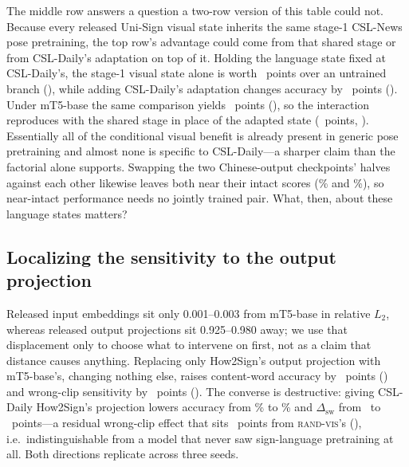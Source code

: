 \documentclass[11pt]{article}
\begin{document}
The middle row answers a question a two-row version of this table could not.
Because every released Uni-Sign visual state inherits the same stage-1 CSL-News
pose pretraining, the top row's advantage could come from that shared stage or
from CSL-Daily's adaptation on top of it. Holding the language state fixed at
CSL-Daily's, the stage-1 visual state alone is worth
\StageOneOnCslMtfiveLexDeltaAbs\ points over an untrained branch
(\StageOneOnCslMtfiveLexCI), while adding CSL-Daily's adaptation changes accuracy
by \StageOneAdaptLexDelta\ points (\StageOneAdaptLexCI). Under mT5-base the same
comparison yields \StageOneOnBaseMtfiveLexDelta\ points
(\StageOneOnBaseMtfiveLexCI), so the interaction reproduces with the shared stage
in place of the adapted state (\InteractionStageOneLexDeltaAbs\ points,
\InteractionStageOneLexCI). Essentially all of the conditional visual benefit is
already present in generic pose pretraining and almost none is specific to
CSL-Daily---a sharper claim than the factorial alone supports. Swapping the two
Chinese-output checkpoints' halves against each other likewise leaves both near
their intact scores (\CrossNewsDailyLexLocal\% and \CrossDailyNewsLexLocal\%), so
near-intact performance needs no jointly trained pair. What, then, about these
language states matters?

\subsection{Localizing the sensitivity to the output projection}
\label{sec:head}

Released input embeddings sit only 0.001--0.003 from mT5-base in relative $L_2$,
whereas released output projections sit 0.925--0.980 away; we use that
displacement only to choose what to intervene on first, not as a claim that
distance causes anything. Replacing only How2Sign's output projection with
mT5-base's, changing nothing else, raises content-word accuracy by
\HeadBaseGainLexDeltaAbs\ points
(\HeadBaseGainLexCI) and wrong-clip sensitivity by \HeadClipBaseGainLex\ points
(\HeadClipBaseGainLexCI). The converse is destructive: giving CSL-Daily
How2Sign's projection lowers accuracy from \CsldailyLexLocal\% to
\HeadCslHowLexLocal\% and $\Delta_{\mathrm{sw}}$ from \CsldailyLexSwapDelta\ to
\HeadCslHowLexSwapDelta\ points---a residual wrong-clip effect that sits
\HeadClipKillVsRandLex\ points from \textsc{rand-vis}'s
(\HeadClipKillVsRandLexCI), i.e.\ indistinguishable from a model that never saw
sign-language pretraining at all. Both directions replicate across three seeds.
\end{document}

